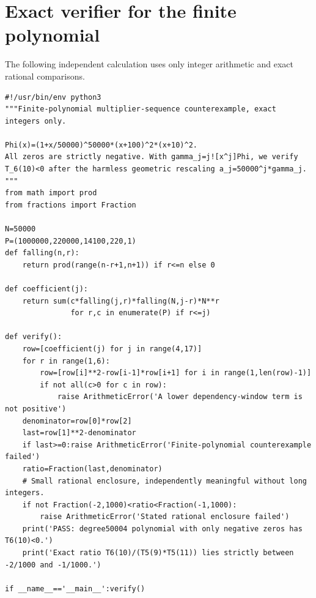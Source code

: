 \documentclass[11pt]{article}
\begin{document}
\section{Exact verifier for the finite polynomial}\label{app:finite}
The following independent calculation uses only integer arithmetic and
exact rational comparisons.
\begin{lstlisting}
#!/usr/bin/env python3
"""Finite-polynomial multiplier-sequence counterexample, exact integers only.

Phi(x)=(1+x/50000)^50000*(x+100)^2*(x+10)^2.
All zeros are strictly negative. With gamma_j=j![x^j]Phi, we verify
T_6(10)<0 after the harmless geometric rescaling a_j=50000^j*gamma_j.
"""
from math import prod
from fractions import Fraction

N=50000
P=(1000000,220000,14100,220,1)
def falling(n,r):
    return prod(range(n-r+1,n+1)) if r<=n else 0

def coefficient(j):
    return sum(c*falling(j,r)*falling(N,j-r)*N**r
               for r,c in enumerate(P) if r<=j)

def verify():
    row=[coefficient(j) for j in range(4,17)]
    for r in range(1,6):
        row=[row[i]**2-row[i-1]*row[i+1] for i in range(1,len(row)-1)]
        if not all(c>0 for c in row):
            raise ArithmeticError('A lower dependency-window term is not positive')
    denominator=row[0]*row[2]
    last=row[1]**2-denominator
    if last>=0:raise ArithmeticError('Finite-polynomial counterexample failed')
    ratio=Fraction(last,denominator)
    # Small rational enclosure, independently meaningful without long integers.
    if not Fraction(-2,1000)<ratio<Fraction(-1,1000):
        raise ArithmeticError('Stated rational enclosure failed')
    print('PASS: degree50004 polynomial with only negative zeros has T6(10)<0.')
    print('Exact ratio T6(10)/(T5(9)*T5(11)) lies strictly between -2/1000 and -1/1000.')

if __name__=='__main__':verify()
\end{lstlisting}
\end{document}
